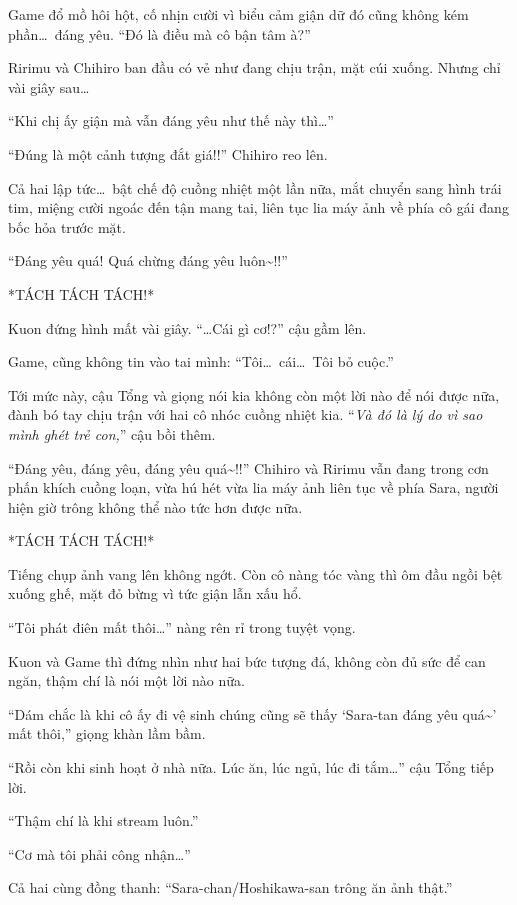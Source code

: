 \documentclass[../main.tex]{subfiles}
\begin{document}
Game đổ mồ hôi hột, cố nhịn cười vì biểu cảm giận dữ đó cũng không kém phần\dots\ đáng yêu. ``Đó là điều mà cô bận tâm à?''

Ririmu và Chihiro ban đầu có vẻ như đang chịu trận, mặt cúi xuống. Nhưng chỉ vài giây sau\dots

``Khi chị ấy giận mà vẫn đáng yêu như thế này thì\dots''

``Đúng là một cảnh tượng đắt giá!!'' Chihiro reo lên.

Cả hai lập tức\dots\ bật chế độ cuồng nhiệt một lần nữa, mắt chuyển sang hình trái tim, miệng cười ngoác đến tận mang tai, liên tục lia máy ảnh về phía cô gái đang bốc hỏa trước mặt.

``Đáng yêu quá! Quá chừng đáng yêu luôn\~{}!!''

*TÁCH TÁCH TÁCH!*

Kuon đứng hình mất vài giây. ``\dots Cái gì cơ!?''  cậu gầm lên.

Game, cũng không tin vào tai mình: ``Tôi\dots\ cái\dots\ Tôi bỏ cuộc.''

Tới mức này, cậu Tổng và giọng nói kia không còn một lời nào để nói được nữa, đành bó tay chịu trận với hai cô nhóc cuồng nhiệt kia. ``\textit{Và đó là lý do vì sao mình ghét trẻ con,}'' cậu bồi thêm.

``Đáng yêu, đáng yêu, đáng yêu quá\~{}!!'' Chihiro và Ririmu vẫn đang trong cơn phấn khích cuồng loạn, vừa hú hét vừa lia máy ảnh liên tục về phía Sara, người hiện giờ trông không thể nào tức hơn được nữa.


*TÁCH TÁCH TÁCH!*

Tiếng chụp ảnh vang lên không ngớt. Còn cô nàng tóc vàng thì ôm đầu ngồi bệt xuống ghế, mặt đỏ bừng vì tức giận lẫn xấu hổ.

``Tôi phát điên mất thôi\dots'' nàng rên rỉ trong tuyệt vọng.

Kuon và Game thì đứng nhìn như hai bức tượng đá, không còn đủ sức để can ngăn, thậm chí là nói một lời nào nữa.

``Dám chắc là khi cô ấy đi vệ sinh chúng cũng sẽ thấy `Sara-tan đáng yêu quá\~{}' mất thôi,'' giọng khàn lầm bầm.

``Rồi còn khi sinh hoạt ở nhà nữa. Lúc ăn, lúc ngủ, lúc đi tắm\dots'' cậu Tổng tiếp lời.

``Thậm chí là khi stream luôn.''

``Cơ mà tôi phải công nhận\dots''

Cả hai cùng đồng thanh: ``Sara-chan/Hoshikawa-san trông ăn ảnh thật.''
\end{document}

